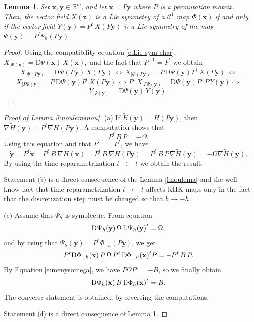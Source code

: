 \documentclass[11pt]{article}
\newtheorem {lemma}  [theorem]{Lemma}
\begin{document}
\begin{lemma}\label{l:ultim}
Set $\mathbf{x},\mathbf{y}\in \mathbb{R}^m$,
and let $\mathbf{x}=P\mathbf{y}$ where $P$ is a permutation matrix. Then, the vector field $X(\mathbf{x})$ is a Lie symmetry of a $\mathcal{C}^1$ map $\Phi(\mathbf{x})$ if and only if the vector field $Y(\mathbf{y})=P^t\,X(P\mathbf{y})$ is a Lie symmetry of the map $\Psi(\mathbf{y})=P^t\Phi_h(P\mathbf{y})$.
\end{lemma}
\begin{proof}
Using the compatibility equation \eqref{e:Lie-sym-char},
$
X_{|\Phi(\mathbf{x})}=\mathrm{D}\Phi(\mathbf{x})\,X(\mathbf{x}),
$ and the fact that $P^{-1}=P^t$ we obtain
$$
X_{|\Phi(P\mathbf{y})}=\mathrm{D}\Phi(P\mathbf{y})\,X(P\mathbf{y})
\,\Leftrightarrow\,
X_{|\Phi(P\mathbf{y})}=P\,\mathrm{D}\Psi(\mathbf{y})P^t\,X(P\mathbf{y})\,\Leftrightarrow
$$
$$
X_{|P\Psi(\mathbf{y})}=P\,\mathrm{D}\Psi(\mathbf{y})P^t\,X(P\mathbf{y})
\,\Leftrightarrow\,
P^t\,X_{|P\Psi(\mathbf{y})}=\mathrm{D}\Psi(\mathbf{y})P^t\,P\,Y(\mathbf{y})\Leftrightarrow
$$
$$
Y_{|\Psi(\mathbf{y})}=\mathrm{D}\Psi(\mathbf{y})\,Y(\mathbf{y}).
$$
\end{proof}

\begin{proof}[Proof of Lemma \ref{l:noulemanou}]
(a) If $\tilde{H}(\mathbf{y})=H(P\mathbf{y})$, then $\nabla \tilde{H}(\mathbf{y})=P^t\nabla H(P\mathbf{y})$.  A computation shows that
\begin{equation}\label{e:menysomega}
P^t\,B\,P=-\Omega.
\end{equation} Using this equation and
 that $P^{-1}=P^t$, we have
$$
\dot{\mathbf{y}}=P^t\dot{\mathbf{x}}=P^t\,B\,\nabla H(\mathbf{x})=P^t\,B\,\nabla H(P\mathbf{y})=
P^t\,B\,P\, \nabla \tilde{H}(\mathbf{y})=-\Omega \nabla \tilde{H}(\mathbf{y}).
$$ By using the time reparametrization $t\to -t$ we obtain the result.

Statement (b) is a direct consequence of the Lemma \ref{l:noulema} and the well know fact that  time reparametrization $t\to -t$ affects KHK maps only in the fact that the discretization step must be changed so that $h\to -h$.

(c) Assume that $\Psi_h$ is symplectic. From equation
$${\mathrm D}\Psi_h({\bf{y}})\,\Omega\,{\mathrm D}\Psi_h({\bf{y}})^t=\Omega,$$
and by using that $\Psi_h(\mathbf{y})=P^t\Phi_{-h}(P\mathbf{y})$, we get
$$
P^t{\mathrm D}\Phi_{-h}({\bf{x}})\,P\,\Omega\,P^t\,{\mathrm D}\Phi_{-h}({\bf{x}})^tP=-P^t\,B\,P.
$$
By Equation \eqref{e:menysomega}, we have $P\Omega P^t=-B$, so we finally obtain
$$
{\mathrm D}\Phi_h({\bf{x}})\,B\,{\mathrm D}\Phi_h({\bf{x}})^t=B.
$$The converse statement is obtained, by reversing the computations.

Statement (d) is a direct consequence of Lemma \ref{l:ultim}.
\end{proof}
\end{document}
